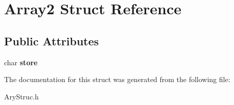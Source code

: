 \hypertarget{struct_array2}{\section{Array2 Struct Reference}
\label{struct_array2}
}
\subsection*{Public Attributes}
\begin{DoxyCompactItemize}
\item 
\hypertarget{struct_array2_a5d77e7046b301eaa6ff4d7cf0aea4229}{char {\bfseries store}}\label{struct_array2_a5d77e7046b301eaa6ff4d7cf0aea4229}

\end{DoxyCompactItemize}


The documentation for this struct was generated from the following file\-:\begin{DoxyCompactItemize}
\item 
Ary\-Struc.\-h\end{DoxyCompactItemize}
